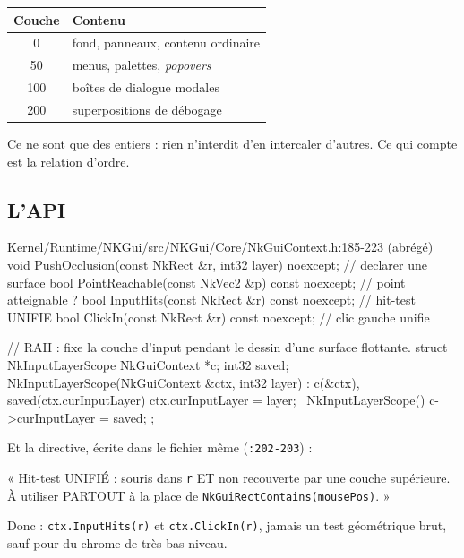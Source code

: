 \begin{center}
\begin{tabular}{@{}cl@{}}
\toprule
\textbf{Couche} & \textbf{Contenu} \\
\midrule
0   & fond, panneaux, contenu ordinaire \\
50  & menus, palettes, \emph{popovers} \\
100 & boîtes de dialogue modales \\
200 & superpositions de débogage \\
\bottomrule
\end{tabular}
\end{center}

Ce ne sont que des entiers : rien n'interdit d'en intercaler d'autres. Ce qui
compte est la relation d'ordre.

\subsection{L'API}

\begin{nkcode}{Kernel/Runtime/NKGui/src/NKGui/Core/NkGuiContext.h:185-223 (abrégé)}
void PushOcclusion(const NkRect &r, int32 layer) noexcept;   // declarer une surface
bool PointReachable(const NkVec2 &p) const noexcept;          // point atteignable ?
bool InputHits(const NkRect &r) const noexcept;               // hit-test UNIFIE
bool ClickIn(const NkRect &r) const noexcept;                 // clic gauche unifie

// RAII : fixe la couche d'input pendant le dessin d'une surface flottante.
struct NkInputLayerScope {
        NkGuiContext *c; int32 saved;
        NkInputLayerScope(NkGuiContext &ctx, int32 layer) : c(&ctx), saved(ctx.curInputLayer) {
            ctx.curInputLayer = layer;
        }
        ~NkInputLayerScope() { c->curInputLayer = saved; }
};
\end{nkcode}

Et la directive, écrite dans le fichier même (\texttt{:202-203}) :

\begin{nkretenir}
« Hit-test UNIFIÉ : souris dans \texttt{r} ET non recouverte par une couche
supérieure. À utiliser PARTOUT à la place de
\texttt{NkGuiRectContains(mousePos)}. »

Donc : \texttt{ctx.InputHits(r)} et \texttt{ctx.ClickIn(r)}, jamais un test
géométrique brut, sauf pour du chrome de très bas niveau.
\end{nkretenir}

